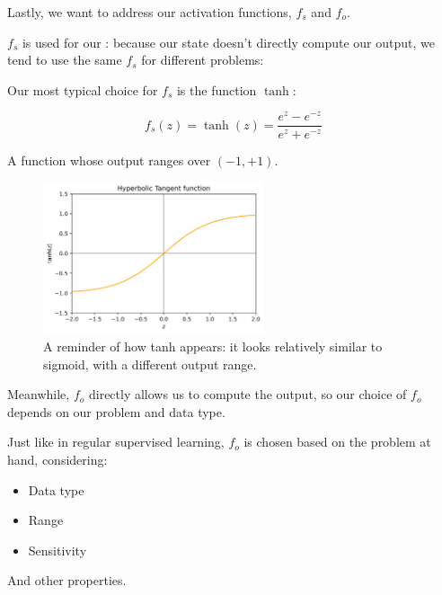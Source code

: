         Lastly, we want to address our activation functions, $f_s$ and $f_o$.

        $f_s$ is used for our : because our state doesn't directly compute our output, we tend to use the same $f_s$ for different problems:\\

        \begin{concept}
            Our most typical choice for $f_s$ is the  function $\tanh$:

            \begin{equation*}
                f_s(z) = \tanh(z) = \frac{e^z-e^{-z}}{e^z+e^{-z}}
            \end{equation*}

            A function whose output ranges over $(-1,+1)$.
        \end{concept}

        \begin{figure}[H]
            \centering
            \includegraphics[width=65mm]{images/nn_images/tanh_fn.png}
    
            \caption*{A reminder of how tanh appears: it looks relatively similar to sigmoid, with a different output range.}
        \end{figure}

        Meanwhile, $f_o$ directly allows us to compute the output, so our choice of $f_o$ depends on our problem and data type.\\

        \begin{concept}
            Just like in regular supervised learning, $f_o$ is chosen based on the problem at hand, considering:

            \begin{itemize}
                \item Data type
                \item Range
                \item Sensitivity
            \end{itemize}

            And other properties.
        \end{concept}




